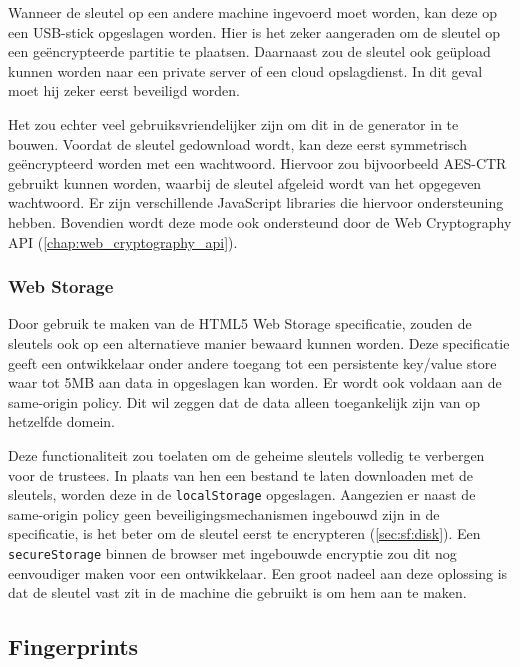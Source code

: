 \npar Wanneer de sleutel op een andere machine ingevoerd moet worden, kan deze op een USB-stick opgeslagen worden. Hier is het zeker aangeraden om de sleutel op een ge\"encrypteerde partitie te plaatsen. Daarnaast zou de sleutel ook ge\"upload kunnen worden naar een private server of een cloud opslagdienst. In dit geval moet hij zeker eerst beveiligd worden.

\npar Het zou echter veel gebruiksvriendelijker zijn om dit in de generator in te bouwen. Voordat de sleutel gedownload wordt, kan deze eerst symmetrisch ge\"encrypteerd worden met een wachtwoord. Hiervoor zou bijvoorbeeld AES-CTR gebruikt kunnen worden, waarbij de sleutel afgeleid wordt van het opgegeven wachtwoord.\cite{rfc2898} Er zijn verschillende JavaScript libraries die hiervoor ondersteuning hebben.\cite{site:github_aes_js}\cite{site:github_sjcl} Bovendien wordt deze mode ook ondersteund door de Web Cryptography API (\ref{chap:web_cryptography_api}).\cite{sleevi_watson_web_cryptography_api}

\subsubsection{Web Storage~\cite{hickson_web_storage}\cite{site:pilgrim_local_storage}}
\label{sec:sf:web_storage}

Door gebruik te maken van de HTML5 Web Storage specificatie, zouden de sleutels ook op een alternatieve manier bewaard kunnen worden. Deze specificatie geeft een ontwikkelaar onder andere toegang tot een persistente key/value store waar tot 5MB aan data in opgeslagen kan worden. Er wordt ook voldaan aan de same-origin policy. Dit wil zeggen dat de data alleen toegankelijk zijn van op hetzelfde domein.\cite{gollman_computer_security}

\npar Deze functionaliteit zou toelaten om de geheime sleutels volledig te verbergen voor de trustees. In plaats van hen een bestand te laten downloaden met de sleutels, worden deze in de \texttt{localStorage} opgeslagen. Aangezien er naast de same-origin policy geen beveiligingsmechanismen ingebouwd zijn in de specificatie, is het beter om de sleutel eerst te encrypteren (\ref{sec:sf:disk}). Een \texttt{secureStorage} binnen de browser met ingebouwde encryptie zou dit nog eenvoudiger maken voor een ontwikkelaar.\cite{site:zakas_securestore} Een groot nadeel aan deze oplossing is dat de sleutel vast zit in de machine die gebruikt is om hem aan te maken.

\subsection{Fingerprints}
\label{sec:sf:fingerprints}

